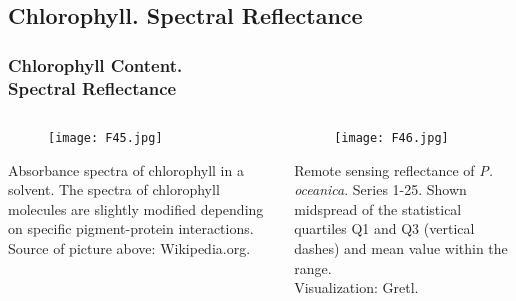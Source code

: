 \documentclass[pdflatex,compress,9pt,
	xcolor={dvipsnames,dvipsnames,svgnames,x11names,table},
	hyperref={colorlinks = true,breaklinks = true, urlcolor = NavyBlue, breaklinks = true}]{beamer}
\begin{document}
\subsection{Chlorophyll. Spectral Reflectance}
\begin{frame}\frametitle{Chlorophyll Content. \\Spectral Reflectance}
\begin{minipage}[0.4\textheight]{\textwidth}
\begin{columns}[T]
\begin{column}{0.4\textwidth}
\begin{figure}[H]
	\centering
		\texttt{[image: F45.jpg]}
\end{figure}
\small{Absorbance spectra of chlorophyll in a solvent. The spectra of chlorophyll molecules are slightly modified depending on specific pigment-protein interactions. Source of picture above: Wikipedia.org.}
\end{column}
\begin{column}{0.6\textwidth}
\vspace{1em} 
\begin{figure}[H]
	\centering
		\texttt{[image: F46.jpg]}
\end{figure}
\small{Remote sensing reflectance of \emph{P. oceanica}. Series 1-25. Shown midspread of the statistical quartiles Q1 and Q3 (vertical dashes) and mean value within the range.\\
Visualization: \ac{Gretl}.}
\end{column}
\end{columns}
\end{minipage}
\end{frame}
\end{document}
